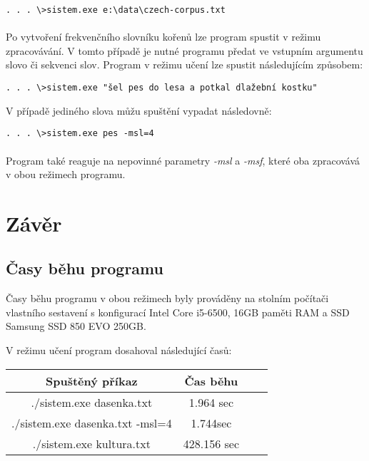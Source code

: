 ﻿\documentclass[12pt, a4paper]{article}
\begin{document}
\begin{verbatim}
. . . \>sistem.exe e:\data\czech-corpus.txt
\end{verbatim}

\paragraph{}
Po vytvoření frekvenčního slovníku kořenů lze program spustit v režimu zpracovávání. V tomto případě je nutné programu předat ve vstupním argumentu slovo či sekvenci slov. Program v režimu učení lze spustit následujícím způsobem:

\begin{verbatim}
. . . \>sistem.exe "šel pes do lesa a potkal dlažební kostku"
\end{verbatim} 

V případě jediného slova můžu spuštění vypadat následovně:

\begin{verbatim}
. . . \>sistem.exe pes -msl=4
\end{verbatim}

\paragraph{}
Program také reaguje na nepovinné parametry \textit{-msl} a \textit{-msf}, které oba zpracovává v obou režimech programu.  

\newpage
\section{Závěr}
\subsection{Časy běhu programu}
Časy běhu programu v obou režimech byly prováděny na stolním počítači vlastního sestavení s konfigurací Intel Core i5-6500, 16GB paměti RAM a SSD Samsung SSD 850 EVO 250GB.

V režimu učení program dosahoval následující časů:
\begin{center}
 \begin{tabular}{||c c c c||} 
 \hline
 Spuštěný příkaz & Čas běhu  \\ [0.5ex] 
 \hline\hline
 ./sistem.exe dasenka.txt & 1.964 sec \\ 
 \hline
 ./sistem.exe dasenka.txt -msl=4 & 1.744sec \\ 
 \hline
 ./sistem.exe kultura.txt & 428.156 sec \\ [1ex] 
 \hline
\end{tabular}
\end{center}
\end{document}
